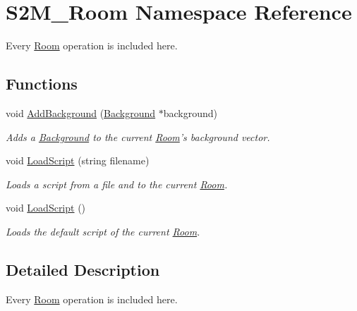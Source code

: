 \hypertarget{namespace_s2_m___room}{\section{S2\-M\-\_\-\-Room Namespace Reference}
\label{namespace_s2_m___room}
}


Every \hyperlink{class_room}{Room} operation is included here.  


\subsection*{Functions}
\begin{DoxyCompactItemize}
\item 
void \hyperlink{namespace_s2_m___room_a5b5e317e2a0d106c7697d8aa670f6877}{Add\-Background} (\hyperlink{class_background}{Background} $\ast$background)
\begin{DoxyCompactList}\small\item\em Adds a \hyperlink{class_background}{Background} to the current \hyperlink{class_room}{Room}'s background vector. \end{DoxyCompactList}\item 
void \hyperlink{namespace_s2_m___room_a3b936fba8d98180f0c9fef406e251492}{Load\-Script} (string filename)
\begin{DoxyCompactList}\small\item\em Loads a script from a file and to the current \hyperlink{class_room}{Room}. \end{DoxyCompactList}\item 
void \hyperlink{namespace_s2_m___room_a3c79e699afea76fc1140b197ca90688c}{Load\-Script} ()
\begin{DoxyCompactList}\small\item\em Loads the default script of the current \hyperlink{class_room}{Room}. \end{DoxyCompactList}\end{DoxyCompactItemize}


\subsection{Detailed Description}
Every \hyperlink{class_room}{Room} operation is included here. 

